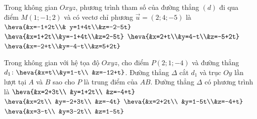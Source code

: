\begin{ex}%
	Trong không gian $Oxyz$, phương trình tham số của đường thẳng $(d)$ đi qua điểm $M(1;-1;2)$  và có vectơ chỉ phương $\overrightarrow u=(2;4;-5)$ là
	 \choice
		{$\heva{&x=-1+2t\\& y=1+4t\\&z=-2-5t}$} 
		{\True  $\heva{&x=1+2t\\&y=-1+4t\\&z=2-5t}$}
		 {$\heva{&x=2+t\\&y=4-t\\&z=-5+2t}$}
		 {$\heva{&x=-2+t\\&y=-4-t\\&z=5+2t}$}
\end{ex}

\begin{ex}%
	Trong không gian với hệ tọa độ $Oxyz$, cho điểm $P(2;1;-4)$ và đường thẳng $d_1 \colon \heva{&x=t\\&y=1-t\\ &z=-12+t}$. Đường thẳng $\Delta$ cắt $d_1$ và trục $Oy$ lần lượt tại $A$ và $B$ sao cho $P$ là trung điểm của $AB$. Đường thẳng $\Delta$ có phương  trình là
	\choice 
		{$\heva{&x=2+3t\\ &y=1+2t\\  &z=-4+t}$}
		{\True $\heva{&x=2t\\ &y=-2+3t\\ &z=-4t}$} 
		{$\heva{&x=2+2t\\  &y=1-5t\\&z=-4+t}$}
		{$\heva{&x=3-t\\ &y=3-2t\\  &z=1-5t}$}
\end{ex}

